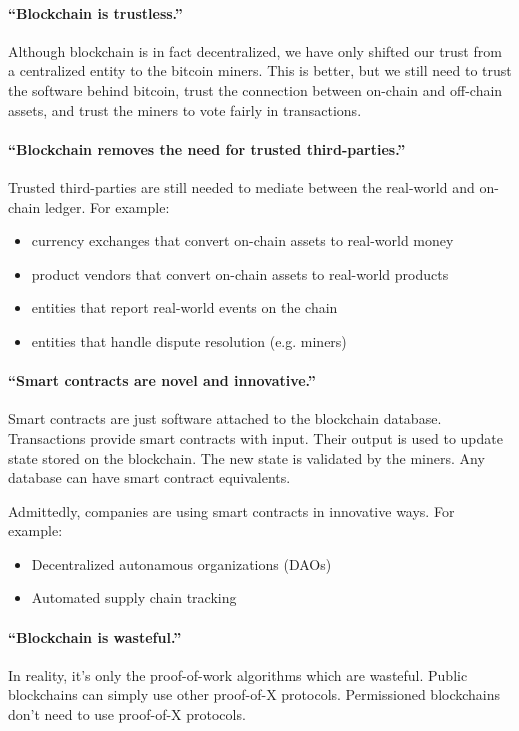 \paragraph{``Blockchain is trustless.''} Although blockchain is in fact decentralized, we have only shifted our trust from a centralized entity to the bitcoin miners. This is better, but we still need to trust the software behind bitcoin, trust the connection between on-chain and off-chain assets, and trust the miners to vote fairly in transactions.

\paragraph{``Blockchain removes the need for trusted third-parties.''}
 Trusted third-parties are still needed to mediate between the real-world and on-chain ledger. For example:
 \begin{itemize}
    \item currency exchanges that convert on-chain assets to real-world money
    \item product vendors that convert on-chain assets to real-world products
    \item entities that report real-world events on the chain
    \item entities that handle dispute resolution (e.g. miners)
 \end{itemize}

\paragraph{``Smart contracts are novel and innovative.''} Smart contracts are just software attached to the blockchain database. Transactions provide smart contracts with input. Their output is used to update state stored on the blockchain. The new state is validated by the miners. Any database can have smart contract equivalents.

Admittedly, companies are using smart contracts in innovative ways. For example:
\begin{itemize}
    \item Decentralized autonamous organizations (DAOs)
    \item Automated supply chain tracking
\end{itemize}

\paragraph{``Blockchain is wasteful.''} In reality, it's only the proof-of-work algorithms which are wasteful. Public blockchains can simply use other proof-of-X protocols. Permissioned blockchains don't need to use proof-of-X protocols.

